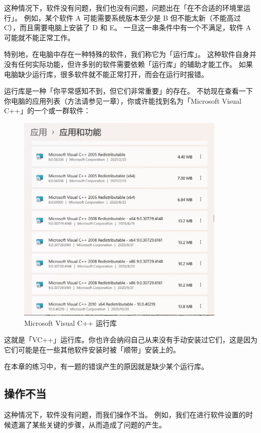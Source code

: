 这种情况下，软件没有问题，我们也没有问题，问题出在「在不合适的环境里运行」。
例如，某个软件 A 可能需要系统版本至少是 B 但不能太新（不能高过 C），而且需要电脑上安装了 D 和 E。
一旦这一串条件中有一个不满足，软件 A 可能就不能正常工作。

特别地，在电脑中存在一种特殊的软件，我们称它为「运行库」。
这种软件自身并没有任何实际功能，但许多别的软件需要依赖「运行库」的辅助才能工作。
如果电脑缺少运行库，很多软件就不能正常打开，而会在运行时报错。

运行库是一种「你平常感知不到，但它们非常重要」的存在。
不妨现在查看一下你电脑的应用列表（方法请参见一章），你或许能找到名为「Microsoft Visual C++」的一个或一群软件：

\begin{figure}[htb!]
  \centering
  \includegraphics[width=10cm]{assets/VCpp_Distribution.jpg}
  \caption{Microsoft Visual C++ 运行库}
  \label{VCpp_Distribution}
\end{figure}

这就是「VC++」运行库。你也许会纳闷自己从来没有手动安装过它们，这是因为它们可能是在一些其他软件安装时被「顺带」安装上的。

在本章的练习中，有一题的错误产生的原因就是缺少某个运行库。

\subsection{操作不当}

这种情况下，软件没有问题，而我们操作不当。
例如，我们在进行软件设置的时候遗漏了某些关键的步骤，从而造成了问题的产生。

